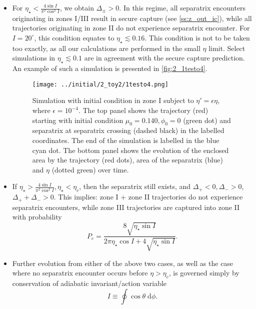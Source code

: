 \documentclass[
        fleqn,
        usenatbib,
    ]{mnras}
\begin{document}
\begin{itemize}
    \item For $\eta_\star < \frac{4\sin I}{\pi^2 \cos^2 I}$, we obtain
        $\Delta_{\pm} > 0$. In this regime, all separatrix encounters
        originating in zones I/III result in secure capture (see
        \autoref{ss:z_out_ic}), while all trajectories originating in zone II do
        not experience separatrix encounter. For $I = 20^\circ$, this condition
        equates to $\eta_\star \lesssim 0.16$. This condition is not to be taken
        too exactly, as all our calculations are performed in the small $\eta$
        limit. Select simulations in $\eta_\star \lesssim 0.1$ are in agreement
        with the secure capture prediction. An example of such a simulation is
        presented in \autoref{fig:2_1testo4}.
        \begin{figure}[t]
            \centering
            \texttt{[image: ../initial/2\_toy2/1testo4.png]}
            \caption{Simulation with initial condition in zone I subject to
            $\eta' = \epsilon \eta$, where $\epsilon = 10^{-4}$. The top panel
            shows the trajectory (red) starting with initial condition $\mu_0 =
            0.140, \phi_0 = 0$ (green dot) and separatrix at separatrix crossing
            (dashed black) in the labelled coordinates. The end of the
            simulation is labelled in the blue cyan dot. The bottom panel shows
            the evolution of the enclosed area by the trajectory (red dots),
            area of the separatrix (blue) and $\eta$ (dotted green) over
            time.}\label{fig:2_1testo4}
        \end{figure}

    \item If $\eta_\star > \frac{4\sin I}{\pi^2 \cos^2 I}, \eta_\star < \eta_c$,
        then the separatrix still exists, and $\Delta_+ < 0, \Delta_- > 0$,
        $\Delta_+ + \Delta_- > 0$. This implies: zone I + zone II trajectories
        do not experience separatrix encounters, while zone III trajectories are
        captured into zone II with probability
        \begin{equation}
            P_c = \frac{8\sqrt{\eta_\star \sin I}}{2\pi \eta_\star \cos I +
                4\sqrt{\eta_\star \sin I}}.
        \end{equation}

    \item Further evolution from either of the above two cases, as well as the
        case where no separatrix encounter occurs before $\eta > \eta_c$, is
        governed simply by conservation of adiabatic invariant/action variable
        \begin{equation}
            I \equiv \oint \cos \theta \;\mathrm{d}\phi.
        \end{equation}
\end{itemize}
\end{document}
